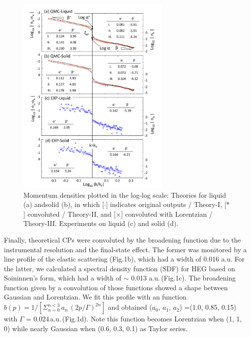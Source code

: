 \documentclass[twocolumn,showpacs,showkeys,fleqn,prl,superscriptaddress]{revtex4}%
\begin{document}
\begin{figure}
\includegraphics[bb= 70 10 500 700, width=7.5cm]{fig3.pdf}
\caption{Momentum densities plotted in the log-log scale:  Theories for liquid (a) andsolid (b), in which  [$\cdot$] indicates original outputs / Theory-I, [$*$] convoluted / Theory-II, and [$\times$] convoluted with Lorentzian / Theory-III.  Experiments on liquid (c) and solid (d).
} 
\label{Fig.3}
\end{figure}


Finally, theoretical CPs were convoluted by the broadening function due to the instrumental resolution and the final-state effect. 
The former was monitored by a line profile of the elastic scattering (Fig.1b), which had a width of 0.016 a.u.
For the latter, we calculated a spectral density function (SDF) for HEG based on Soininnen's form\cite{soi01}, which had a width of $\sim$ 0.013 a.u.\,(Fig.1c).
The broadening function given by a {\color{red}convolution} of those functions showed a shape between Gaussian and Lorentzian.
We fit this profile with an function $b(p) =1/ [ \Sigma_{n=0}^{n<3}\,a_n\,(2p / \Gamma )^{2n} ]$ and obtained ($a_0$, $a_1$, $a_2$) =(1.0, 0.85, 0.15) with $\Gamma$ = 0.024\,a.u.\,(Fig.1d).
Note this function becomes Lorentzian when (1, 1, 0) while nearly Gaussian when (0.6, 0.3, 0.1) as Taylor series. 
\end{document}
